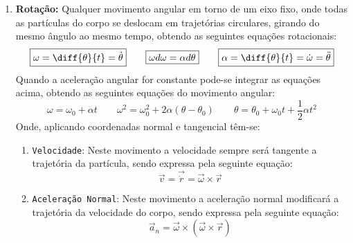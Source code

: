 \documentclass{article}
\begin{document}
\begin{enumerate}[rightmargin = \leftmargin]
                    \item \textbf{Rotação:} Qualquer movimento angular em torno de um eixo fixo, onde todas as partículas do corpo se deslocam em trajetórias circulares, girando do mesmo ângulo ao mesmo tempo, obtendo as seguintes equações rotacionais:
                        \begin{equation}
                            \boxed{
                                \omega = \diff{\theta}{t} = \dot{\theta}
                            }
                            \qquad
                            \boxed{
                                \omega d \omega =\alpha d\theta
                            }
                            \qquad
                            \boxed{
                                \alpha = \diff{\theta}{t} = \dot{\omega} = \ddot{\theta}
                            }
                        \end{equation}
                    Quando a aceleração angular for constante pode-se  integrar as equações acima, obtendo as seguintes equações do movimento angular: 
                        \begin{equation}
                            \boxed{
                                \omega = \omega_{0} + \alpha t
                            }
                            \qquad
                            \boxed{
                                \omega^{2} = \omega^{2}_{0} + 2\alpha(\theta - \theta_{0})
                            }
                            \qquad
                            \boxed{
                                \theta = \theta_{0} + \omega_{0} t + \frac{1}{2}\alpha t^{2}
                            }
                        \end{equation}
                    Onde, aplicando coordenadas normal e tangencial têm-se:
                        \begin{enumerate}[rightmargin = \leftmargin]
                            \item \texttt{Velocidade}: Neste movimento a velocidade sempre será tangente a trajetória da partícula, sendo expressa pela seguinte equação:
                                \begin{equation}
                                    \boxed{
                                        \vec{v} = \vec{\dot{r}} = \vec{\omega}\times\vec{r}
                                    }
                                \end{equation}
        
                            \item \texttt{Aceleração Normal}: Neste movimento a aceleração normal modificará a trajetória da velocidade do corpo, sendo expressa pela seguinte equação:
                                \begin{equation}
                                    \boxed{
                                        \vec{a}_{n} = \vec{\omega} \times (\vec{\omega}\times\vec{r})
                                    }
                                \end{equation}
        

\end{enumerate}
\end{enumerate}
\end{document}
